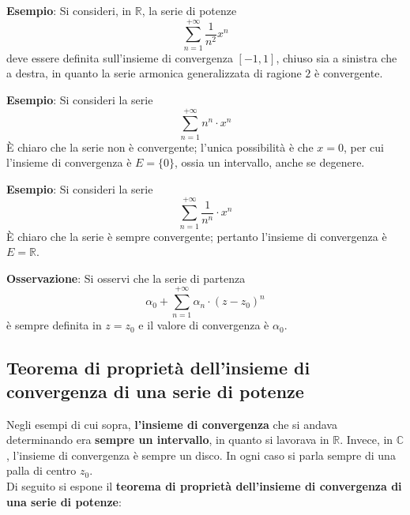 \documentclass[a4paper]{extarticle}
\begin{document}
\vspace{1em}
\noindent
\textbf{Esempio}: Si consideri, in $\mathbb{R}$, la serie di potenze
\[\sum_{n=1}^{+\infty} \frac{1}{n^2} x^n\]
deve essere definita sull'insieme di convergenza $[-1,1]$, chiuso sia a sinistra che a destra, in quanto la serie armonica generalizzata di ragione $2$ è convergente.

\vspace{1em}
\noindent
\textbf{Esempio}: Si consideri la serie
\[\sum_{n=1}^{+\infty} n^n \cdot x^n\]
È chiaro che la serie non è convergente; l'unica possibilità è che $x=0$, per cui l'insieme di convergenza è $E=\{0\}$, ossia un intervallo, anche se degenere.

\vspace{1em}
\noindent
\textbf{Esempio}: Si consideri la serie
\[\sum_{n=1}^{+\infty} \dfrac{1}{n^n} \cdot x^n\]
È chiaro che la serie è sempre convergente; pertanto l'insieme di convergenza è $E=\mathbb{R}$.

\vspace{1em}
\noindent
\textbf{Osservazione}: Si osservi che la serie di partenza
\[\alpha_0 + \sum_{n=1}^{+\infty} \alpha_n \cdot (z-z_0)^n\]
è sempre definita in $z=z_0$ e il valore di convergenza è $\alpha_0$.

\vspace{1em}
\subsection{Teorema di proprietà dell'insieme di convergenza di una serie di potenze}
Negli esempi di cui sopra, \textbf{l'insieme di convergenza} che si andava determinando era \textbf{sempre un intervallo}, in quanto si lavorava in $\mathbb{R}$. Invece, in $\mathbb{C}$, l'insieme di convergenza è sempre un disco. In ogni caso si parla sempre di una palla di centro $z_0$.\\
Di seguito si espone il \textbf{teorema di proprietà dell'insieme di convergenza di una serie di potenze}:
\end{document}
